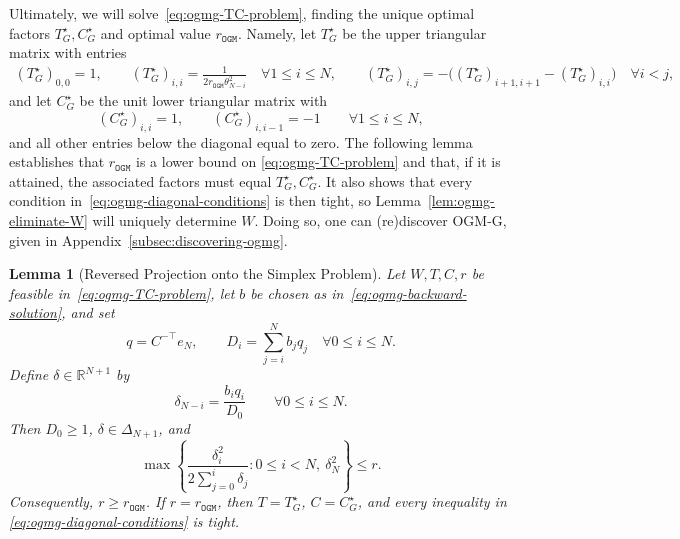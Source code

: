 \documentclass[11pt]{article}
\newtheorem{lemma}[thm]{Lemma}
\begin{document}
Ultimately, we will solve~\eqref{eq:ogmg-TC-problem}, finding the unique
optimal factors $T_G^\star,C_G^\star$ and optimal value
$r_\mathtt{OGM}$. Namely, let $T_G^\star$ be the upper triangular matrix
with entries
\begin{equation}\label{eq:ogmg-T-star-r}
\begin{aligned}
(T_G^\star)_{0,0}=1,
\qquad
(T_G^\star)_{i,i}=\frac{1}{2r_\mathtt{OGM}\theta_{N-i}^2}
\quad \forall 1\leq i\leq N,
\qquad
(T_G^\star)_{i,j}
=-\bigl((T_G^\star)_{i+1,i+1}-(T_G^\star)_{i,i}\bigr)
\quad \forall i<j,
\end{aligned}
\end{equation}
and let $C_G^\star$ be the unit lower triangular matrix with
\begin{equation}\label{eq:ogmg-C-star-r}
(C_G^\star)_{i,i}=1,
\qquad
(C_G^\star)_{i,i-1}=-1
\qquad \forall 1\leq i\leq N,
\end{equation}
and all other entries below the diagonal equal to zero. The following lemma
establishes that $r_\mathtt{OGM}$ is a lower bound on
\eqref{eq:ogmg-TC-problem} and that, if it is attained, the associated
factors must equal $T_G^\star,C_G^\star$. It also shows that every condition
in~\eqref{eq:ogmg-diagonal-conditions} is then tight, so
Lemma~\ref{lem:ogmg-eliminate-W} will uniquely determine $W$. Doing so, one can (re)discover OGM-G, given in Appendix~\ref{subsec:discovering-ogmg}.

\begin{lemma}[Reversed Projection onto the Simplex Problem]
\label{lem:ogmg-TC-projection}
Let $W,T,C,r$ be feasible in~\eqref{eq:ogmg-TC-problem}, let $b$ be chosen as
in~\eqref{eq:ogmg-backward-solution}, and set
\begin{equation}\label{eq:ogmg-green-quantities}
q=C^{-\top}e_N,
\qquad
D_i=\sum_{j=i}^N b_jq_j
\quad \forall 0\leq i\leq N.
\end{equation}
Define $\delta\in\mathbb{R}^{N+1}$ by
\begin{equation}\label{eq:ogmg-delta-from-TC}
\delta_{N-i}=\frac{b_iq_i}{D_0}
\qquad \forall 0\leq i\leq N.
\end{equation}
Then $D_0\geq1$, $\delta\in\Delta_{N+1}$, and
\begin{equation}\label{eq:ogmg-projected-chain}
\max\left\{
\frac{\delta_i^2}{2\sum_{j=0}^i\delta_j}:0\leq i<N,
\ \delta_N^2
\right\}
\leq r.
\end{equation}
Consequently, $r\geq r_\mathtt{OGM}$. If $r=r_\mathtt{OGM}$, then
$T=T_G^\star$, $C=C_G^\star$, and every inequality in
\eqref{eq:ogmg-diagonal-conditions} is tight.
\end{lemma}
\end{document}
